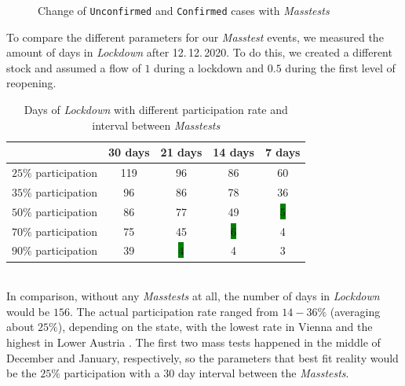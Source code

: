 \documentclass
[
    report,
    11pt,
    bibliography = totoc,
    listof = totoc,
    headinclude = true,
]
{scrreport}
\begin{document}
\begin{figure}[!h]
  \centering
  \qquad
  \caption{Change of \texttt{Unconfirmed} and \texttt{Confirmed} cases with \textit{Masstests}}%
  \label{uncon&con}
\end{figure}



To compare the different parameters for our \textit{Masstest} events, we measured the amount of days in \textit{Lockdown} after 12.\,12.\,2020. To do this, we created a different stock and assumed a flow of $1$ during a lockdown and $0.5$ during the first level of reopening.
\begin{table}[!h]
{\small%
\begin{center}
\begin{tabular}{|c||c|c|c|c|}
\hline
& 30 days   & 21 days   & 14 days   & 7 days  \\
 \hline
 \hline
     $25\%$ participation & 119 &96 & 86 & 60\\
 \hline
     $35\%$ participation & 96 &  86&  78  & 36   \\
 \hline
     $50\%$ participation & 86 & 77 & 49 & \colorbox{green}{5}\\
 \hline
     $70\%$ participation & 75 &  45 & \colorbox{green}{6} & 4 \\
 \hline
     $90\%$ participation & 39 & \colorbox{green}{4} &4  & 3\\
     \hline
\end{tabular}
\end{center}
}

\caption{Days of \textit{Lockdown} with different participation rate and interval between \textit{Masstests}}
\end{table} \\
In comparison, without any \textit{Masstests} at all, the number of days in \textit{Lockdown} would be $156$. The actual participation rate ranged from $14 - 36\%$ (averaging about $25\%$), depending on the state, with the lowest rate in Vienna and the highest in Lower Austria \cite{MassTests}. The first two mass tests happened in the middle of December and January, respectively, so the parameters that best fit reality would be the $25\%$ participation with a $30$ day interval between the \textit{Masstests}.
\end{document}
